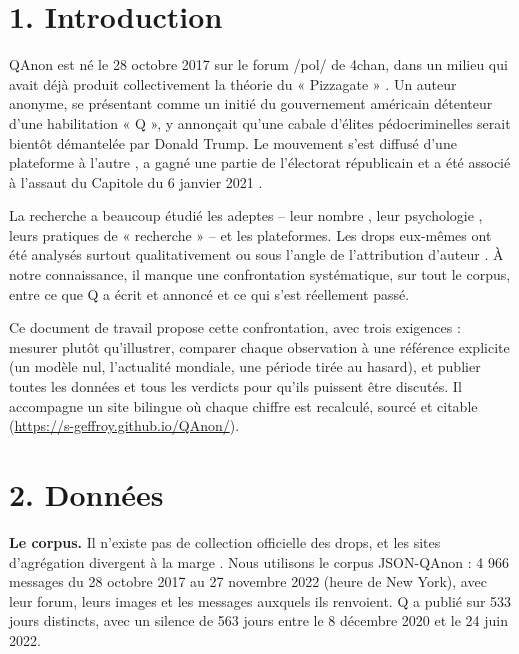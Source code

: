 \documentclass[11pt,a4paper]{article}
\begin{document}
\section*{1. Introduction}

QAnon est né le 28 octobre 2017 sur le forum /pol/ de 4chan, dans un milieu qui avait déjà produit collectivement la théorie du « Pizzagate » \parencite{tuters2018posttruth}. Un auteur anonyme, se présentant comme un initié du gouvernement américain détenteur d'une habilitation « Q », y annonçait qu'une cabale d'élites pédocriminelles serait bientôt démantelée par Donald Trump. Le mouvement s'est diffusé d'une plateforme à l'autre \parencite{dezeeuw2020tracing}, a gagné une partie de l'électorat républicain \parencite{sommer2023trust} et a été associé à l'assaut du Capitole du 6 janvier 2021 \parencite{jensen2024qanon}.

La recherche a beaucoup étudié les adeptes – leur nombre \parencite{enders2022who,prri2024rise}, leur psychologie \parencite{bloom2021pastels}, leurs pratiques de « recherche » \parencite{marwick2024constructing} – et les plateformes. Les drops eux-mêmes ont été analysés surtout qualitativement \parencite{linvill2021mapping,mcintosh2022sinister} ou sous l'angle de l'attribution d'auteur \parencite{papasavva2022gospel,cafiero2023who}. À notre connaissance, il manque une confrontation systématique, sur tout le corpus, entre ce que Q a écrit et annoncé et ce qui s'est réellement passé.

Ce document de travail propose cette confrontation, avec trois exigences : mesurer plutôt qu'illustrer, comparer chaque observation à une référence explicite (un modèle nul, l'actualité mondiale, une période tirée au hasard), et publier toutes les données et tous les verdicts pour qu'ils puissent être discutés. Il accompagne un site bilingue où chaque chiffre est recalculé, sourcé et citable (\url{https://s-geffroy.github.io/QAnon/}).

\section*{2. Données}

\textbf{Le corpus.} Il n'existe pas de collection officielle des drops, et les sites d'agrégation divergent à la marge \parencite{papasavva2022gospel}. Nous utilisons le corpus JSON-QAnon \parencite{kingsman2021qanon} : 4 966 messages du 28 octobre 2017 au 27 novembre 2022 (heure de New York), avec leur forum, leurs images et les messages auxquels ils renvoient. Q a publié sur 533 jours distincts, avec un silence de 563 jours entre le 8 décembre 2020 et le 24 juin 2022.
\end{document}
